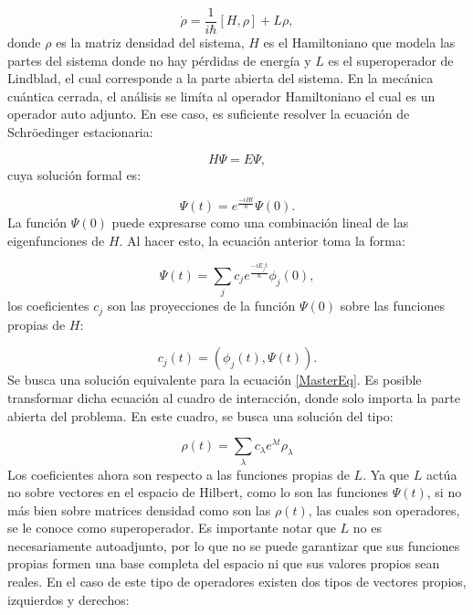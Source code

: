 \documentclass[a4paper,10pt]{report}
\begin{document}
\begin{equation}\label{MasterEq}
\dot{\rho} = \frac{1}{i\hbar}[H,\rho] + L\rho,
\end{equation} donde $\rho$ es la matriz densidad del sistema, $H$ es el Hamiltoniano que modela las partes del sistema donde no hay pérdidas de energía y $L$ es el superoperador de Lindblad, el cual corresponde a la parte abierta del sistema. En la mecánica cuántica cerrada, el análisis se limíta al operador Hamiltoniano el cual es un operador auto adjunto. En ese caso, es suficiente resolver la ecuación de Schröedinger estacionaria:

\begin{equation}
H\Psi = E\Psi,
\end{equation} cuya solución formal es:

\begin{equation}
\Psi(t) = e^{\frac{-iHt}{\hbar}}\Psi(0).
\end{equation} La función $\Psi(0)$ puede expresarse como una  combinación lineal de las eigenfunciones de $H$. Al hacer esto, la ecuación anterior toma la forma:

\begin{equation}
\Psi(t) = \sum_j c_j e^{\frac{-iE_jt}{\hbar}}\phi_j(0),
\end{equation}los coeficientes $c_j$ son las proyecciones de la función $\Psi(0)$ sobre las funciones propias de $H$:

\begin{equation}
c_j(t)= (\phi_j(t),\Psi(t)).
\end{equation} Se busca una solución equivalente para la ecuación \eqref{MasterEq}. Es posible transformar dicha ecuación al cuadro de interacción, donde solo importa la parte abierta del problema. En este cuadro, se busca una solución del tipo:

\begin{equation}
\rho(t) = \sum_{\lambda} c_{\lambda} e^{\lambda t}\rho_{\lambda} 
\end{equation} Los coeficientes ahora son respecto a las funciones propias de $L$. Ya que $L$ actúa no sobre vectores en el espacio de Hilbert, como lo son las funciones $\Psi(t)$, si no más bien sobre matrices densidad como son las $\rho(t)$, las cuales son operadores, se le conoce como superoperador. Es importante notar que $L$ no es necesariamente autoadjunto, por lo que no se puede garantizar que sus funciones propias formen una base completa del espacio ni que sus valores propios sean reales. En el caso de este tipo de operadores existen dos tipos de vectores propios\cite{BarnettSD}, izquierdos y derechos:
\end{document}
